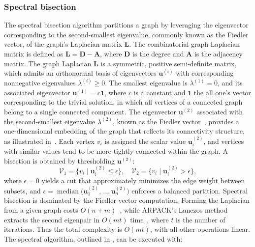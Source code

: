     \subsubsection{Spectral bisection}\label{sub:spec} The spectral bisection algorithm partitions a graph
    by leveraging the eigenvector corresponding to the second-smallest eigenvalue,
    commonly known as the Fiedler vector, of the graph's Laplacian matrix $\mathbf{L}$.
    The combinatorial graph Laplacian matrix is defined as $\mathbf{L} = \mathbf{D}-\mathbf{A}$,
    where $\mathbf{D}$ is the degree and $\mathbf{A}$ is the adjacency matrix.
    The graph Laplacian $\mathbf{L}$ is a symmetric, positive semi-definite matrix, which admits an orthonormal basis of eigenvectors $\mathbf{u}^{(i)}$ with corresponding nonnegative eigenvalues
    $\lambda^{(i)} \ge 0$.
    The smallest eigenvalue is
    $\lambda^{(1)} = 0$, and its associated eigenvector
    $\mathbf{u}^{(1)} = c\mathbf{1}$, where $c$ is a constant and $\mathbf{1}$ the all one’s vector corresponding to the trivial solution, in which all vertices of a connected graph belong to a single connected component.
    The eigenvector $\mathbf{u}^{(2)}$
    associated with the second-smallest eigenvalue $\lambda^{(2)}$, known as the Fiedler vector~\cite{fiedler75}, provides a one-dimensional embedding of the graph that reflects its connectivity structure, as illustrated in~. Each vertex $v_i$ is assigned the scalar value $\mathbf{u}_i^{(2)}$, and vertices with similar values tend to be more tightly connected within the graph. A bisection is obtained by
    thresholding $\mathbf{u}^{(2)}$:
    \begin{equation}
        \mathcal{V}_1 = \{v_i \mid \mathbf{u}_i^{(2)} \leq \epsilon\}, \quad
        \mathcal{V}_2 = \{v_i \mid \mathbf{u}_i^{(2)} > \epsilon\},
    \end{equation}
    where $\epsilon=0$ yields a cut that approximately minimizes the edge weight between subsets, and $\epsilon=\operatorname{median}\big(\mathbf{u}^{(2)}_1, \dots, \mathbf{u}^{(2)}_n\big)$ enforces a balanced partition.
    Spectral bisection is dominated by the Fiedler vector computation. Forming the Laplacian from a given graph costs $O(n + m)$~\cite{Pasadakis23}, while ARPACK's Lanczos method~\cite{lehoucq1998arpack, lanczos1950iteration} extracts the second eigenpair in $O(mt)$ time~\cite{golub2013matrix}, where $t$ is the number of iterations. Thus the total complexity is $O(mt)$, with all other operations linear.
    The spectral algorithm, outlined in , can be executed with:
    
